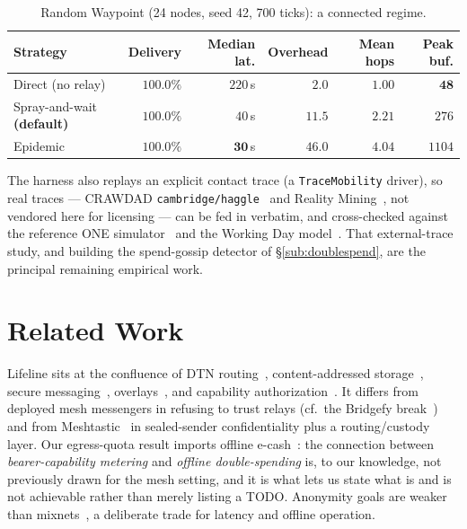 \documentclass[11pt]{article}
\begin{document}
\begin{table}[t]\centering\small
\begin{tabular}{@{}lrrrrr@{}}
\toprule
\textbf{Strategy} & \textbf{Delivery} & \textbf{Median lat.} & \textbf{Overhead} & \textbf{Mean hops} & \textbf{Peak buf.}\\
\midrule
Direct (no relay) & $100.0\%$ & $220$\,s & $2.0$ & $1.00$ & $\mathbf{48}$\\
Spray-and-wait \textbf{(default)} & $100.0\%$ & $40$\,s & $\mathbf{11.5}$ & $2.21$ & $276$\\
Epidemic & $100.0\%$ & $\mathbf{30}$\,s & $46.0$ & $4.04$ & $1104$\\
\bottomrule
\end{tabular}
\caption{Random Waypoint (24 nodes, seed 42, 700 ticks): a connected regime.}
\label{tab:rwp}
\end{table}

The harness also replays an explicit contact trace (a \texttt{TraceMobility}
driver), so real traces --- CRAWDAD \texttt{cambridge/haggle}~\cite{crawdad_haggle}
and Reality Mining~\cite{eagle2006realitymining}, not vendored here for licensing
--- can be fed in verbatim, and cross-checked against the reference ONE
simulator~\cite{keranen2009one} and the Working Day
model~\cite{ekman2008workingday}. That external-trace study, and building the
spend-gossip detector of \S\ref{sub:doublespend}, are the principal remaining
empirical work.

\section{Related Work}\label{sec:related}

Lifeline sits at the confluence of DTN routing~\cite{rfc4838,vahdat2000epidemic,
spyropoulos2005sprayandwait}, content-addressed storage~\cite{benet2014ipfs,
cohen2003bittorrent}, secure messaging~\cite{marlinspike2016x3dh,
perrin2016doubleratchet}, overlays~\cite{maymounkov2002kademlia}, and
capability authorization~\cite{birgisson2014macaroons,biscuit2021}. It differs
from deployed mesh messengers in refusing to trust relays (cf.\ the Bridgefy
break~\cite{albrecht2021bridgefy}) and from Meshtastic~\cite{meshtastic} in
sealed-sender confidentiality plus a routing/custody layer. Our egress-quota
result imports offline e-cash~\cite{chaum1990ecash}: the connection between
\emph{bearer-capability metering} and \emph{offline double-spending} is, to our
knowledge, not previously drawn for the mesh setting, and it is what lets us state
what is and is not achievable rather than merely listing a TODO. Anonymity goals
are weaker than mixnets~\cite{vandenhooff2015vuvuzela,piotrowska2017loopix}, a
deliberate trade for latency and offline operation.
\end{document}

